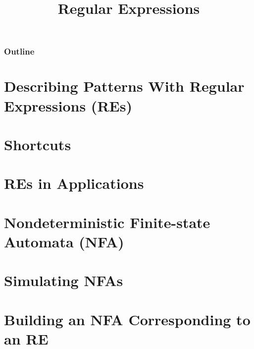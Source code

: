 \documentclass[8pt,a4paper,compress]{beamer}
\title{Regular Expressions}
\date{}
\begin{document}
\begin{frame}
\vfill
\titlepage
\end{frame}

\begin{frame}
\frametitle{Outline}
\tableofcontents
\end{frame}

\section{Describing Patterns With Regular Expressions (REs)}
\begin{frame}[fragile]
\pause

\end{frame}

\section{Shortcuts}
\begin{frame}[fragile]
\pause

\end{frame}

\section{REs in Applications}
\begin{frame}[fragile]
\pause

\end{frame}

\section{Nondeterministic Finite-state Automata (NFA)}
\begin{frame}[fragile]
\pause

\end{frame}

\section{Simulating NFAs}
\begin{frame}[fragile]
\pause

\end{frame}

\section{Building an NFA Corresponding to an RE}
\begin{frame}[fragile]
\pause

\end{frame}
\end{document}
